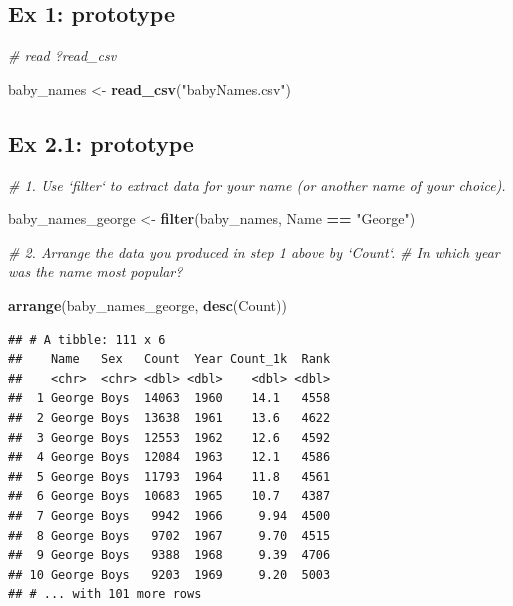\documentclass[]{book}
\newenvironment{Shaded}{\begin{snugshade}}{\end{snugshade}}
\newcommand{\CommentTok}[1]{\textcolor[rgb]{0.56,0.35,0.01}{\textit{#1}}}
\newcommand{\KeywordTok}[1]{\textcolor[rgb]{0.13,0.29,0.53}{\textbf{#1}}}
\newcommand{\NormalTok}[1]{#1}
\newcommand{\OperatorTok}[1]{\textcolor[rgb]{0.81,0.36,0.00}{\textbf{#1}}}
\newcommand{\StringTok}[1]{\textcolor[rgb]{0.31,0.60,0.02}{#1}}
\begin{document}
\hypertarget{ex-1-prototype}{%
\subsection{Ex 1: prototype}\label{ex-1-prototype}}

\begin{Shaded}
\begin{Highlighting}[]
\CommentTok{# read ?read_csv}
\end{Highlighting}
\end{Shaded}

\begin{Shaded}
\begin{Highlighting}[]
\NormalTok{baby_names <-}\StringTok{ }\KeywordTok{read_csv}\NormalTok{(}\StringTok{"babyNames.csv"}\NormalTok{)}
\end{Highlighting}
\end{Shaded}

\hypertarget{ex-2.1-prototype}{%
\subsection{Ex 2.1: prototype}\label{ex-2.1-prototype}}

\begin{Shaded}
\begin{Highlighting}[]
\CommentTok{# 1.  Use `filter` to extract data for your name (or another name of your choice).}

\NormalTok{baby_names_george <-}\StringTok{ }\KeywordTok{filter}\NormalTok{(baby_names, Name }\OperatorTok{==}\StringTok{ "George"}\NormalTok{)}
\end{Highlighting}
\end{Shaded}

\begin{Shaded}
\begin{Highlighting}[]
\CommentTok{# 2.  Arrange the data you produced in step 1 above by `Count`. }
\CommentTok{#     In which year was the name most popular?}

\KeywordTok{arrange}\NormalTok{(baby_names_george, }\KeywordTok{desc}\NormalTok{(Count))}
\end{Highlighting}
\end{Shaded}

\begin{verbatim}
## # A tibble: 111 x 6
##    Name   Sex   Count  Year Count_1k  Rank
##    <chr>  <chr> <dbl> <dbl>    <dbl> <dbl>
##  1 George Boys  14063  1960    14.1   4558
##  2 George Boys  13638  1961    13.6   4622
##  3 George Boys  12553  1962    12.6   4592
##  4 George Boys  12084  1963    12.1   4586
##  5 George Boys  11793  1964    11.8   4561
##  6 George Boys  10683  1965    10.7   4387
##  7 George Boys   9942  1966     9.94  4500
##  8 George Boys   9702  1967     9.70  4515
##  9 George Boys   9388  1968     9.39  4706
## 10 George Boys   9203  1969     9.20  5003
## # ... with 101 more rows
\end{verbatim}
\end{document}

